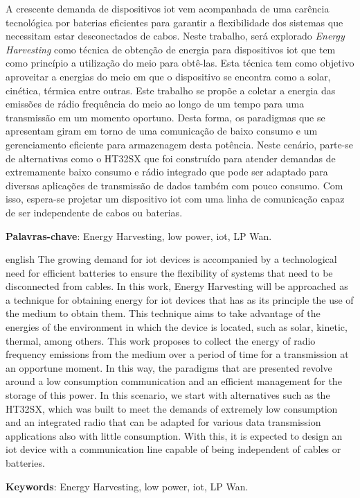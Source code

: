 \setlength{\absparsep}{18pt} %
\begin{resumo}
    A crescente demanda de dispositivos iot vem acompanhada de uma carência tecnológica por baterias eficientes para garantir a flexibilidade dos sistemas que necessitam estar desconectados de cabos. Neste trabalho, será explorado \textit{Energy Harvesting} como técnica de obtenção de energia para dispositivos iot que tem como princípio a utilização do meio para obtê-las. Esta técnica tem como objetivo aproveitar a energias do meio em que o dispositivo se encontra como a solar, cinética, térmica entre outras. Este trabalho se propõe a coletar a energia das emissões de rádio frequência do meio ao longo de um tempo para uma transmissão em um momento oportuno. Desta forma, os paradigmas que se apresentam giram em torno de uma comunicação de baixo consumo e um gerenciamento eficiente para armazenagem desta potência. Neste cenário, parte-se de alternativas como o HT32SX que foi construído para atender demandas de extremamente baixo consumo e rádio integrado que pode ser adaptado para diversas aplicações de transmissão de dados também com pouco consumo. Com isso, espera-se projetar um dispositivo iot com uma linha de comunicação capaz de ser independente de cabos ou baterias.

 \textbf{Palavras-chave}: Energy Harvesting, low power, iot, LP Wan.
\end{resumo}

\begin{resumo}[Abstract]
 \begin{otherlanguage*}{english}
The growing demand for iot devices is accompanied by a technological need for efficient batteries to ensure the flexibility of systems that need to be disconnected from cables. In this work, Energy Harvesting will be approached as a technique for obtaining energy for iot devices that has as its principle the use of the medium to obtain them. This technique aims to take advantage of the energies of the environment in which the device is located, such as solar, kinetic, thermal, among others. This work proposes to collect the energy of radio frequency emissions from the medium over a period of time for a transmission at an opportune moment. In this way, the paradigms that are presented revolve around a low consumption communication and an efficient management for the storage of this power. In this scenario, we start with alternatives such as the HT32SX, which was built to meet the demands of extremely low consumption and an integrated radio that can be adapted for various data transmission applications also with little consumption. With this, it is expected to design an iot device with a communication line capable of being independent of cables or batteries.

   \vspace{\onelineskip}
 
   \noindent 
   \textbf{Keywords}: Energy Harvesting, low power, iot, LP Wan.
 \end{otherlanguage*}
\end{resumo}


